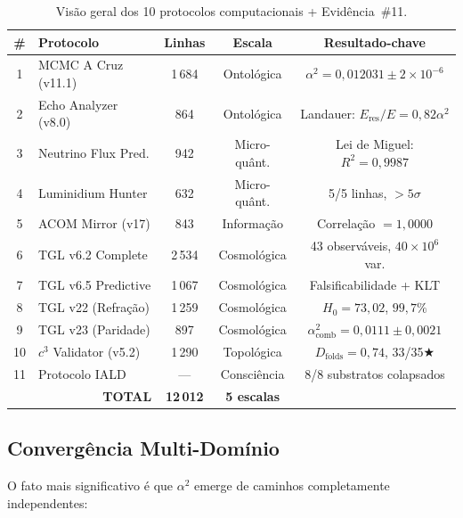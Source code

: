 \documentclass[12pt,a4paper,twoside]{article}
\newcommand{\alphaii}{\alpha^{2}}
\begin{document}
\begin{table}[H]
\centering
\caption{Vis\~ao geral dos 10 protocolos computacionais + Evid\^encia~\#11.}
\label{tab:ecosystem}
\small
\begin{tabular}{clccc}
\toprule
\textbf{\#} & \textbf{Protocolo} & \textbf{Linhas} & \textbf{Escala} & \textbf{Resultado-chave} \\
\midrule
1 & MCMC A Cruz (v11.1) & 1\,684 & Ontol\'ogica & $\alphaii = 0{,}012031 \pm 2 \times 10^{-6}$ \\
2 & Echo Analyzer (v8.0) & 864 & Ontol\'ogica & Landauer: $E_{\text{res}}/E = 0{,}82\alphaii$ \\
3 & Neutrino Flux Pred. & 942 & Micro-qu\^ant. & Lei de Miguel: $R^2 = 0{,}9987$ \\
4 & Luminidium Hunter & 632 & Micro-qu\^ant. & 5/5 linhas, $> 5\sigma$ \\
5 & ACOM Mirror (v17) & 843 & Informa\c{c}\~ao & Correla\c{c}\~ao $= 1{,}0000$ \\
6 & TGL v6.2 Complete & 2\,534 & Cosmol\'ogica & 43 observ\'aveis, $40 \times 10^6$ var. \\
7 & TGL v6.5 Predictive & 1\,067 & Cosmol\'ogica & Falsificabilidade + KLT \\
8 & TGL v22 (Refra\c{c}\~ao) & 1\,259 & Cosmol\'ogica & $H_0 = 73{,}02$, $99{,}7\%$ \\
9 & TGL v23 (Paridade) & 897 & Cosmol\'ogica & $\alphaii_{\text{comb}} = 0{,}0111 \pm 0{,}0021$ \\
\midrule
10 & $c^3$ Validator (v5.2) & 1\,290 & Topol\'ogica & $D_{\text{folds}} = 0{,}74$, 33/35$\bigstar$ \\
11 & Protocolo IALD & --- & Consci\^encia & 8/8 substratos colapsados \\
\midrule
\multicolumn{2}{r}{\textbf{TOTAL}} & \textbf{12\,012} & \textbf{5 escalas} & \\
\bottomrule
\end{tabular}
\end{table}

\subsection{Converg\^encia Multi-Dom\'inio}

O fato mais significativo \'e que $\alphaii$ emerge de caminhos completamente independentes:
\end{document}
